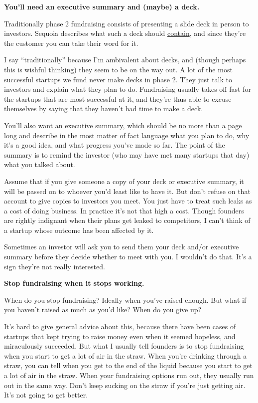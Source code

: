 \documentclass[12pt]{book}
\begin{document}
\textbf{You'll need an executive summary and (maybe) a deck.}

Traditionally phase 2 fundraising consists of presenting a slide deck in
person to investors. Sequoia describes what such a deck should
\href{http://www.sequoiacap.com/ideas}{contain}, and since they're the
customer you can take their word for it.

I say ``traditionally'' because I'm ambivalent about decks, and (though
perhaps this is wishful thinking) they seem to be on the way out. A lot
of the most successful startups we fund never make decks in phase 2.
They just talk to investors and explain what they plan to do.
Fundraising usually takes off fast for the startups that are most
successful at it, and they're thus able to excuse themselves by saying
that they haven't had time to make a deck.

You'll also want an executive summary, which should be no more than a
page long and describe in the most matter of fact language what you plan
to do, why it's a good idea, and what progress you've made so far. The
point of the summary is to remind the investor (who may have met many
startups that day) what you talked about.

Assume that if you give someone a copy of your deck or executive
summary, it will be passed on to whoever you'd least like to have it.
But don't refuse on that account to give copies to investors you meet.
You just have to treat such leaks as a cost of doing business. In
practice it's not that high a cost. Though founders are rightly
indignant when their plans get leaked to competitors, I can't think of a
startup whose outcome has been affected by it.

Sometimes an investor will ask you to send them your deck and/or
executive summary before they decide whether to meet with you. I
wouldn't do that. It's a sign they're not really interested.

\textbf{Stop fundraising when it stops working.}

When do you stop fundraising? Ideally when you've raised enough. But
what if you haven't raised as much as you'd like? When do you give up?

It's hard to give general advice about this, because there have been
cases of startups that kept trying to raise money even when it seemed
hopeless, and miraculously succeeded. But what I usually tell founders
is to stop fundraising when you start to get a lot of air in the straw.
When you're drinking through a straw, you can tell when you get to the
end of the liquid because you start to get a lot of air in the straw.
When your fundraising options run out, they usually run out in the same
way. Don't keep sucking on the straw if you're just getting air. It's
not going to get better.
\end{document}
